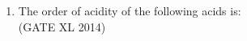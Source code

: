 \documentclass[journal,12pt,onecolumn]{IEEEtran}
\theoremstyle{remark}
\begin{document}
\begin{enumerate}
  \item The order of acidity of the following acids is: \\
  \hfill (GATE XL 2014)\\
  \begin{enumerate}
\end{enumerate}
\end{enumerate}
\end{document}

